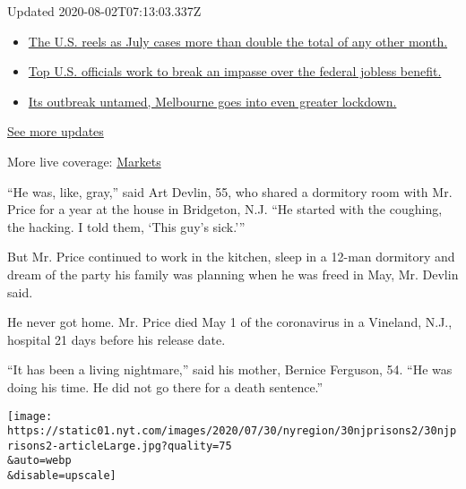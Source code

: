 Updated 2020-08-02T07:13:03.337Z

\begin{itemize}
\tightlist
\item
  \href{https://www.nytimes.com/2020/08/01/world/coronavirus-covid-19.html?action=click\&pgtype=Article\&state=default\&region=MAIN_CONTENT_1\&context=storylines_live_updates\#link-34047410}{The
  U.S. reels as July cases more than double the total of any other
  month.}
\item
  \href{https://www.nytimes.com/2020/08/01/world/coronavirus-covid-19.html?action=click\&pgtype=Article\&state=default\&region=MAIN_CONTENT_1\&context=storylines_live_updates\#link-780ec966}{Top
  U.S. officials work to break an impasse over the federal jobless
  benefit.}
\item
  \href{https://www.nytimes.com/2020/08/01/world/coronavirus-covid-19.html?action=click\&pgtype=Article\&state=default\&region=MAIN_CONTENT_1\&context=storylines_live_updates\#link-2bc8948}{Its
  outbreak untamed, Melbourne goes into even greater lockdown.}
\end{itemize}

\href{https://www.nytimes.com/2020/08/01/world/coronavirus-covid-19.html?action=click\&pgtype=Article\&state=default\&region=MAIN_CONTENT_1\&context=storylines_live_updates}{See
more updates}

More live coverage:
\href{https://www.nytimes.com/live/2020/07/31/business/stock-market-today-coronavirus?action=click\&pgtype=Article\&state=default\&region=MAIN_CONTENT_1\&context=storylines_live_updates}{Markets}

``He was, like, gray,'' said Art Devlin, 55, who shared a dormitory room
with Mr. Price for a year at the house in Bridgeton, N.J. ``He started
with the coughing, the hacking. I told them, `This guy's sick.'''

But Mr. Price continued to work in the kitchen, sleep in a 12-man
dormitory and dream of the party his family was planning when he was
freed in May, Mr. Devlin said.

He never got home. Mr. Price died May 1 of the coronavirus in a
Vineland, N.J., hospital 21 days before his release date.

``It has been a living nightmare,'' said his mother, Bernice Ferguson,
54. ``He was doing his time. He did not go there for a death sentence.''

\texttt{[image: https://static01.nyt.com/images/2020/07/30/nyregion/30njprisons2/30njprisons2-articleLarge.jpg?quality=75\\\&auto=webp\\\&disable=upscale]}

